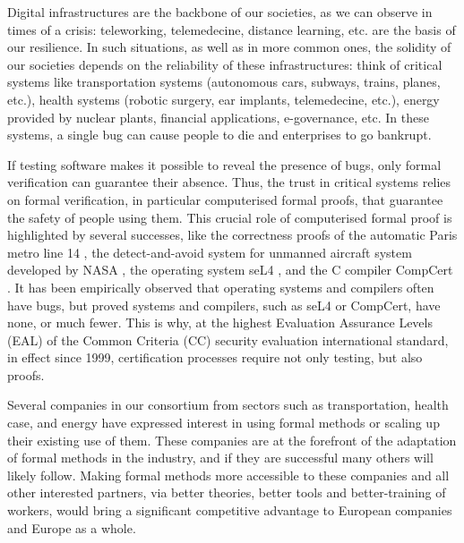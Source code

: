 \thispagestyle{empty}


Digital infrastructures are the backbone of our societies, as we can
observe in times of a crisis: teleworking, telemedecine, distance
learning, etc. are the basis of our resilience.  In such situations,
as well as in more common ones, the solidity of our societies depends
on the reliability of these infrastructures: think of critical systems
like transportation systems (autonomous cars, subways, trains, planes,
etc.), health systems (robotic surgery, ear implants, telemedecine,
etc.), energy provided by nuclear plants, financial applications,
e-governance, etc. In these systems, a single bug can cause people to
die and enterprises to go bankrupt.

If testing software makes it possible to reveal the presence of
bugs, only formal verification can guarantee their absence. Thus, the
trust in critical systems relies on formal verification, in particular
computerised formal proofs, that guarantee the safety of people using
them. This crucial role of computerised formal proof is highlighted by
several successes, like the correctness proofs of the automatic Paris
metro line 14 \cite{Behm98,Lecomte17}, the detect-and-avoid system for
unmanned aircraft system developed by NASA \cite{Munoz16}, the
operating system seL4 \cite{Klein09}, and the C compiler CompCert
\cite{Leroy06}.  It has been empirically observed that operating
systems and compilers often have bugs, but proved systems and
compilers, such as seL4 or CompCert, have none, or much fewer.  This
is why, at the highest Evaluation Assurance Levels (EAL) of the Common
Criteria (CC) security evaluation international standard, in effect
since 1999, certification processes require not only testing, but also
proofs.

Several companies in our consortium from sectors such as
transportation, health case, and energy have expressed interest in
using formal methods or scaling up their existing use of them. These
companies are at the forefront of the adaptation of formal methods in
the industry, and if they are successful many others will likely
follow. Making formal methods more accessible to these companies
and all other interested partners, via better theories, better tools
and better-training of workers, would bring a significant
competitive advantage to European companies and Europe as a whole.

